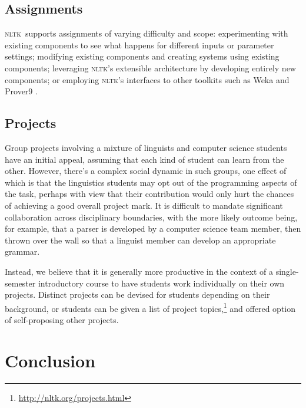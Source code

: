 \documentclass[11pt]{article}
\newcommand{\NLTK}{\textsc{nltk}}
\begin{document}
\subsection{Assignments}

\NLTK\ supports assignments of varying difficulty and scope:
experimenting with existing components to see what happens for
different inputs or parameter settings;
modifying existing components and creating systems using existing components;
leveraging \NLTK's extensible architecture by developing entirely new components;
or employing \NLTK's interfaces to other toolkits such as Weka \cite{WittenFrank05}
and Prover9 \cite{McCune08}.

\subsection{Projects}

Group projects involving a mixture of linguists and computer science
students have an initial appeal, assuming that each kind of student
can learn from the other.  However, there's a complex social dynamic
in such groups, one effect of which is that the linguistics students
may opt out of the programming aspects of the task, perhaps with view
that their contribution would only hurt the chances of achieving a
good overall project mark. It is difficult to mandate significant
collaboration across disciplinary boundaries, with the more likely
outcome being, for example, that a parser is developed by a computer
science team member, then thrown over the wall so that a linguist
member can develop an appropriate grammar.

Instead, we believe that it is generally more productive in the
context of a single-semester introductory course to have students work individually
on their own projects.  Distinct projects can be devised for students
depending on their background, or students can be given a list of
project topics,\footnote{\url{http://nltk.org/projects.html}} and offered option of
self-proposing other projects.


\section{Conclusion}
\end{document}

